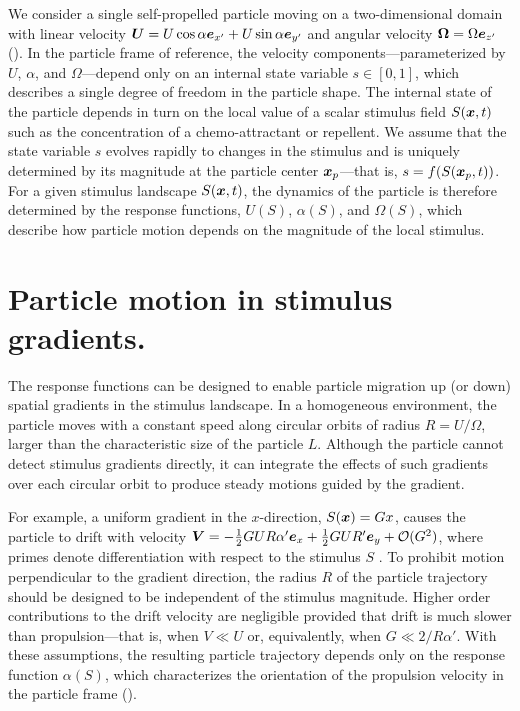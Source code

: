 We consider a single self-propelled particle moving on a two-dimensional domain with linear velocity $\boldsymbol{U}=U\cos\alpha \boldsymbol{e}_{x'} + U\sin\alpha \boldsymbol{e}_{y'}$ and angular velocity $\boldsymbol{\Omega}=\Omega \boldsymbol{e}_{z'}$ (). In the particle frame of reference, the velocity components---parameterized by $U$, $\alpha$, and $\Omega$---depend only on an internal state variable $s\in[0,1]$, which describes a single degree of freedom in the particle shape.  The internal state of the particle depends in turn on the local value of a scalar stimulus field $S(\boldsymbol{x},t)$ such as the concentration of a chemo-attractant or repellent.  We assume that the state variable $s$ evolves rapidly to changes in the stimulus and is uniquely determined by its magnitude at the particle center $\boldsymbol{x}_p$---that is, $s=f(S(\boldsymbol{x}_p,t))$. For a given stimulus landscape $S(\boldsymbol{x},t)$, the dynamics of the particle is therefore determined by the response functions, $U(S)$, $\alpha(S)$, and $\Omega(S)$, which describe how particle motion depends on the magnitude of the local stimulus.

\section{Particle motion in stimulus gradients.} %
The response functions can be designed to enable particle migration up (or down) spatial gradients in the stimulus landscape. In a homogeneous environment, the particle moves with a constant speed along circular orbits of radius $R=U/\Omega$, larger than the characteristic size of the particle $L$.  Although the particle cannot detect stimulus gradients directly, it can integrate the effects of such gradients over each circular orbit to produce steady motions guided by the gradient. 

For example, a uniform gradient in the $x$-direction, $S(\boldsymbol{x})=G x$, causes the particle to drift with velocity $\boldsymbol{V}=-\tfrac{1}{2}G U R \alpha' \boldsymbol{e}_x + \tfrac{1}{2}G U R' \boldsymbol{e}_y + \mathcal{O}(G^2)$, where primes denote differentiation with respect to the stimulus $S$ \cite{Supp}. To prohibit motion perpendicular to the gradient direction, the radius $R$ of the particle trajectory should be designed to be independent of the stimulus magnitude. Higher order contributions to the drift velocity are negligible provided that drift is much slower than propulsion---that is, when $V\ll U$ or, equivalently, when $G\ll 2/R\alpha'$. With these assumptions, the resulting particle trajectory depends only on the response function $\alpha(S)$, which characterizes the orientation of the propulsion velocity in the particle frame ().

